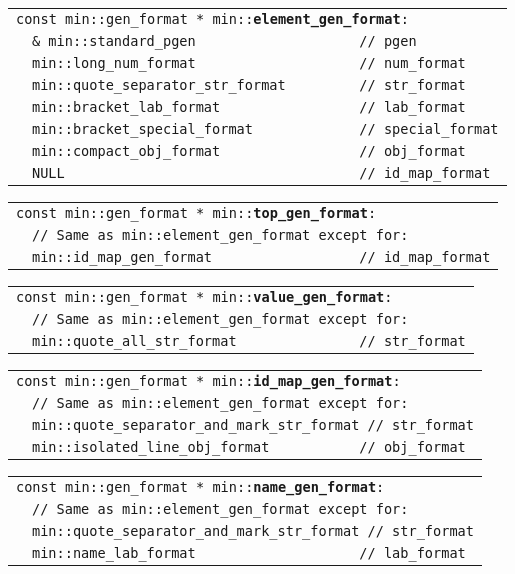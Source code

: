 \documentclass[12pt]{article}
\makeatletter
\newcommand{\TT}[1]{{\tt \bfseries #1}}
\newcommand{\ttindex}[1]{\index{#1@{\tt #1}}}
\newenvironment{indpar}[1][0.3in]%
	{\begin{list}{}%
		     {\setlength{\itemsep}{0in}%
		      \setlength{\topsep}{0in}%
		      \setlength{\parsep}{1ex}%
		      \setlength{\labelwidth}{#1}%
		      \setlength{\leftmargin}{#1}%
		      \addtolength{\leftmargin}{\labelsep}}%
	 \item}%
	{\end{list}}
\newcommand{\LABEL}[1]{\label{#1}}
\newlength{\ARGBREAKLENGTH}
\newcommand{\ARGBREAK}[1][\ARGBREAKLENGTH]{\\&\hspace*{#1}}
\newcommand{\MINKEY}[1]%
	   {\TT{#1}\ttindex{min::#1}\ttindex{#1}}
\makeatother
\begin{document}
\begin{indpar}[1em]\begin{tabular}{r@{}l}
\multicolumn{2}{l}{\tt const min::gen\_format *
                   min::\MINKEY{element\_gen\_format}:}
\LABEL{MIN::ELEMENT_GEN_FORMAT}\ARGBREAK
\verb|& min::standard_pgen                    // pgen |\ARGBREAK
\verb|min::long_num_format                    // num_format|\ARGBREAK
\verb|min::quote_separator_str_format         // str_format|\ARGBREAK
\verb|min::bracket_lab_format                 // lab_format|\ARGBREAK
\verb|min::bracket_special_format             // special_format|\ARGBREAK
\verb|min::compact_obj_format                 // obj_format|\ARGBREAK
\verb|NULL                                    // id_map_format|
\end{tabular}\end{indpar}

\begin{indpar}[1em]\begin{tabular}{r@{}l}
\multicolumn{2}{l}{\tt const min::gen\_format *
                   min::\MINKEY{top\_gen\_format}:}
\LABEL{MIN::TOP_GEN_FORMAT}\ARGBREAK
\verb|// Same as min::element_gen_format except for:|\ARGBREAK
\verb|min::id_map_gen_format                  // id_map_format|
\end{tabular}\end{indpar}

\begin{indpar}[1em]\begin{tabular}{r@{}l}
\multicolumn{2}{l}{\tt const min::gen\_format *
                   min::\MINKEY{value\_gen\_format}:}
\LABEL{MIN::VALUE_GEN_FORMAT}\ARGBREAK
\verb|// Same as min::element_gen_format except for:|\ARGBREAK
\verb|min::quote_all_str_format               // str_format|
\end{tabular}\end{indpar}

\begin{indpar}[1em]\begin{tabular}{r@{}l}
\multicolumn{2}{l}{\tt const min::gen\_format *
                   min::\MINKEY{id\_map\_gen\_format}:}
\LABEL{MIN::ID_MAP_GEN_FORMAT}\ARGBREAK
\verb|// Same as min::element_gen_format except for:|\ARGBREAK
\verb|min::quote_separator_and_mark_str_format // str_format|\ARGBREAK
\verb|min::isolated_line_obj_format           // obj_format|
\end{tabular}\end{indpar}

\begin{indpar}[1em]\begin{tabular}{r@{}l}
\multicolumn{2}{l}{\tt const min::gen\_format *
                   min::\MINKEY{name\_gen\_format}:}
\LABEL{MIN::NAME_GEN_FORMAT}\ARGBREAK
\verb|// Same as min::element_gen_format except for:|\ARGBREAK
\verb|min::quote_separator_and_mark_str_format // str_format|\ARGBREAK
\verb|min::name_lab_format                    // lab_format|
\end{tabular}\end{indpar}
\end{document}
